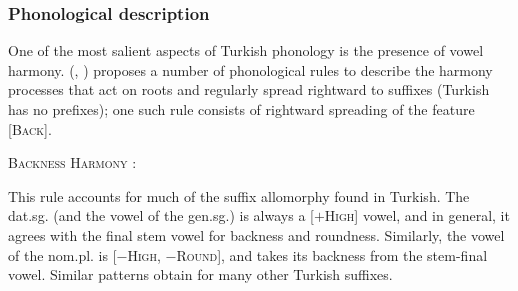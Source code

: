 
\subsubsection{Phonological description}

One of the most salient aspects of Turkish phonology is the presence of vowel harmony. \citeauthor{Lees1966a} (\citeyear[][284]{Lees1966b}, \citeyear[][35]{Lees1966a}) proposes a number of phonological rules to describe the harmony processes that act on roots and regularly spread rightward to suffixes (Turkish has no prefixes); one such rule consists of rightward spreading of the feature [\textsc{Back}].

\ex \textsc{Backness Harmony} \citep[e.g.,][229]{Clements1982}: \\
\xe


This rule accounts for much of the suffix allomorphy found in Turkish. The dat.sg. (and the vowel of the gen.sg.) is always a [$+$\textsc{High}] vowel, and in general, it agrees with the final stem vowel for backness and roundness. Similarly, the vowel of the nom.pl. is [$-$\textsc{High}, $-$\textsc{Round}], and takes its backness from the stem-final vowel. Similar patterns obtain for many other Turkish suffixes.

